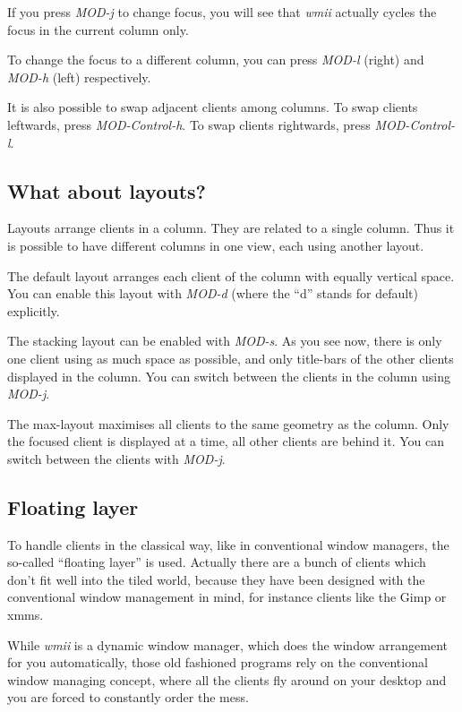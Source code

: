 \documentclass[12pt,a4paper]{article} %
\newcommand{\wmii}{\emph{wmii}}
\begin{document}
    If you press \emph{MOD-j} to change focus, you will see that \wmii
    actually cycles the focus in the current column only.

    To change the focus to a different column, you can press \emph{MOD-l}
    (right) and \emph{MOD-h} (left) respectively.

    It is also possible to swap adjacent clients among columns. To swap
    clients leftwards, press \emph{MOD-Control-h}. To swap clients
    rightwards, press \emph{MOD-Control-l}.

    \subsection{What about layouts?}

    Layouts arrange clients in a column. They are related to a single
    column.  Thus it is possible to have different columns in one view, each
    using another layout.

    The default layout arranges each client of the column with equally
    vertical space. You can enable this layout with \emph{MOD-d}
    (where the ``d'' stands for default) explicitly.

    The stacking layout can be enabled with \emph{MOD-s}.  As you see now,
    there is only one client using as much space as possible, and only
    title-bars of the other clients displayed in the column. You can 
    switch between the clients in the column using \emph{MOD-j}.

    The max-layout maximises all clients to the same geometry as the column.
    Only the focused client is displayed at a time, all other clients
    are behind it. You can switch between the clients with \emph{MOD-j}.

    \subsection{Floating layer}

    To handle clients in the classical way, like in conventional window
    managers, the so-called ``floating layer'' is used. Actually there are a
    bunch of clients which don't fit well into the tiled world, because they
    have been designed with the conventional window management in mind,
    for instance clients like the Gimp or xmms.

    While \wmii{} is a dynamic window manager, which does the window arrangement
    for you automatically, those old fashioned programs rely on the
    conventional window managing concept, where all the clients fly around on
    your desktop and you are forced to constantly order the mess.
\end{document}
